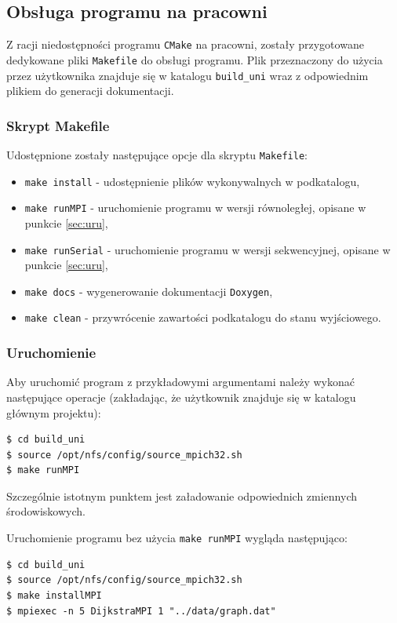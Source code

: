 \documentclass[12pt]{article}
\begin{document}
\subsection{Obsługa programu na pracowni}
Z racji niedostępności programu \lstinline|CMake| na pracowni, zostały przygotowane dedykowane pliki \lstinline|Makefile| do obsługi programu. Plik przeznaczony do użycia przez użytkownika znajduje się w katalogu \lstinline|build_uni| wraz z odpowiednim plikiem do generacji dokumentacji.

\subsubsection{Skrypt Makefile}

Udostępnione zostały następujące opcje dla skryptu \lstinline|Makefile|:
\begin{itemize}
\item \lstinline|make install| - udostępnienie plików wykonywalnych w podkatalogu,
\item \lstinline|make runMPI|  -  uruchomienie programu w wersji równoległej, opisane w punkcie \ref{sec:uru},
\item \lstinline|make runSerial|  - uruchomienie programu w wersji sekwencyjnej, opisane w punkcie  \ref{sec:uru},
\item \lstinline|make docs| - wygenerowanie dokumentacji \lstinline|Doxygen|, 
\item \lstinline|make clean| - przywrócenie zawartości podkatalogu do stanu wyjściowego.
\end{itemize}

\subsubsection{Uruchomienie}
Aby uruchomić program z przykładowymi argumentami należy wykonać następujące operacje (zakładając, że użytkownik znajduje się w katalogu głównym projektu):
\begin{lstlisting}
$ cd build_uni
$ source /opt/nfs/config/source_mpich32.sh
$ make runMPI
\end{lstlisting}

Szczególnie istotnym punktem jest załadowanie odpowiednich zmiennych środowiskowych.

Uruchomienie programu bez użycia \lstinline|make runMPI| wygląda następująco:
\begin{lstlisting}
$ cd build_uni
$ source /opt/nfs/config/source_mpich32.sh
$ make installMPI
$ mpiexec -n 5 DijkstraMPI 1 "../data/graph.dat"
\end{lstlisting}
\end{document}
